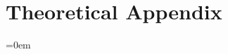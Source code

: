 \section{Theoretical Appendix}

\begingroup
\parindent=0em
\localtableofcontents
\endgroup



% 



% 



% 
